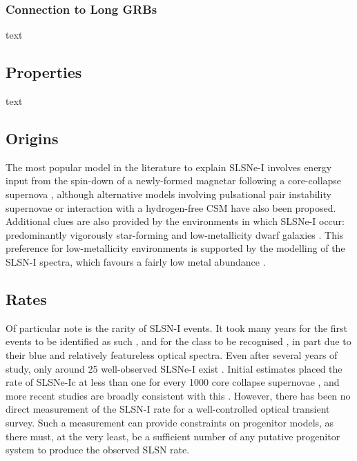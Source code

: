 \subsubsection{Connection to Long GRBs}
text

\subsection{Properties}
text

\subsection{Origins}
The most popular model in the literature to explain SLSNe-I involves
energy input from the spin-down of a newly-formed magnetar following a
core-collapse supernova
\citep{2010ApJ...717..245K,2010ApJ...719L.204W,2013ApJ...770..128I},
although alternative models involving pulsational pair instability
supernovae \citep{2007Natur.450..390W,2015ApJ...814..108Y} or
interaction with a hydrogen-free CSM
\citep{2011ApJ...729L...6C,2013ApJ...773...76C,2015arXiv151000834S}
have also been proposed. Additional clues are also provided by the
environments in which SLSNe-I occur: predominantly vigorously
star-forming and low-metallicity dwarf galaxies \citep[e.g.,][]{2014ApJ...787..138L,2015MNRAS.449..917L,2016arXiv160504925C}. This preference for low-metallicity
environments is supported by the modelling of the SLSN-I spectra,
which favours a fairly low metal abundance
\citep{2016MNRAS.458.3455M}.

\subsection{Rates}
Of particular note is the rarity of SLSN-I events. It took many years
for the first events to be identified as such
\citep{2007ApJ...668L..99Q,2009ApJ...690.1358B}, and for the class to
be recognised \citep{2011Natur.474..487Q}, in part due to their blue
and relatively featureless optical spectra. Even after several years
of study, only around 25 well-observed SLSNe-I exist \citep[e.g., see
compilations
in][]{2014ApJ...796...87I,2015MNRAS.449.1215P,2015MNRAS.452.3869N}.
Initial estimates placed the rate of SLSNe-Ic at less than one for
every 1000 core collapse supernovae \citep{2011Natur.474..487Q}, and more
recent studies are broadly consistent with this
\citep{2013MNRAS.431..912Q,2015MNRAS.448.1206M}.  However, there has
been no direct measurement of the SLSN-I rate for a well-controlled
optical transient survey. Such a measurement can provide constraints
on progenitor models, as there must, at the very least, be a
sufficient number of any putative progenitor system to produce the
observed SLSN rate.

